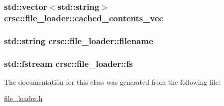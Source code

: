 \subsubsection[{\texorpdfstring{cached\+\_\+contents\+\_\+vec}{cached_contents_vec}}]{\setlength{\rightskip}{0pt plus 5cm}std\+::vector$<$std\+::string$>$ crsc\+::file\+\_\+loader\+::cached\+\_\+contents\+\_\+vec\hspace{0.3cm}{\ttfamily [private]}}\hypertarget{classcrsc_1_1file__loader_a66bc2dbbce9b17845a19526de7a8b3f1}{}\label{classcrsc_1_1file__loader_a66bc2dbbce9b17845a19526de7a8b3f1}
\subsubsection[{\texorpdfstring{filename}{filename}}]{\setlength{\rightskip}{0pt plus 5cm}std\+::string crsc\+::file\+\_\+loader\+::filename\hspace{0.3cm}{\ttfamily [private]}}\hypertarget{classcrsc_1_1file__loader_af656c06c4193868b5b13f29e5ccbf5d7}{}\label{classcrsc_1_1file__loader_af656c06c4193868b5b13f29e5ccbf5d7}
\subsubsection[{\texorpdfstring{fs}{fs}}]{\setlength{\rightskip}{0pt plus 5cm}std\+::fstream crsc\+::file\+\_\+loader\+::fs\hspace{0.3cm}{\ttfamily [private]}}\hypertarget{classcrsc_1_1file__loader_a7957bc89279fd8ba00c6511cdef26134}{}\label{classcrsc_1_1file__loader_a7957bc89279fd8ba00c6511cdef26134}


The documentation for this class was generated from the following file\+:\begin{DoxyCompactItemize}
\item 
\hyperlink{file__loader_8h}{file\+\_\+loader.\+h}\end{DoxyCompactItemize}
